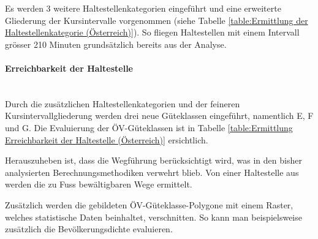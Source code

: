 Es werden 3 weitere Haltestellenkategorien eingeführt und eine erweiterte Gliederung der Kursintervalle vorgenommen (siehe Tabelle \ref{table:Ermittlung der Haltestellenkategorie (Österreich)}).
So fliegen Haltestellen mit einem Intervall grösser 210 Minuten grundsätzlich bereits aus der Analyse.

\paragraph{Erreichbarkeit der Haltestelle}~\\
\label{Berechnungsmethodik Österreich:Erreichbarkeit der Haltestelle}
Durch die zusätzlichen Haltestellenkategorien und der feineren Kursintervallgliederung werden drei neue Güteklassen eingeführt, namentlich E, F und G.
Die Evaluierung der \acs{ÖV}-Güteklassen ist in Tabelle \ref{table:Ermittlung Erreichbarkeit der Haltestelle (Österreich)} ersichtlich.

Herauszuheben ist, dass die Wegführung berücksichtigt wird, was in den bisher analysierten Berechnungsmethodiken verwehrt blieb.
Von einer Haltestelle aus werden die zu Fuss bewältigbaren Wege ermittelt.

Zusätzlich werden die gebildeten \acs{ÖV}-Güteklasse-Polygone mit einem Raster, welches statistische Daten beinhaltet, verschnitten.
So kann man beispielsweise zusätzlich die Bevölkerungsdichte evaluieren.

